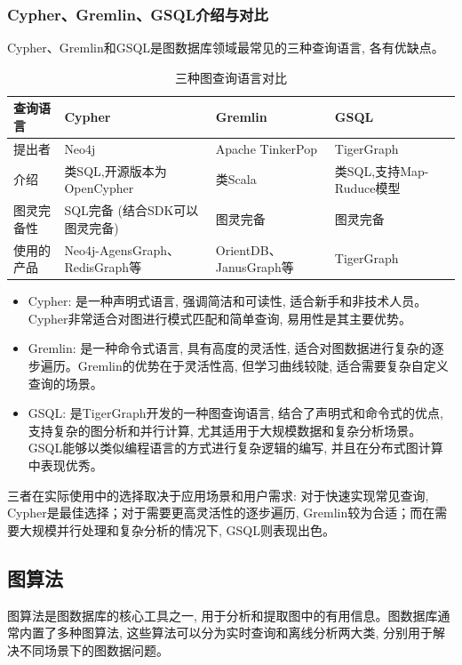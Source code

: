 \subsubsection*{Cypher、Gremlin、GSQL介绍与对比}
Cypher、Gremlin和GSQL是图数据库领域最常见的三种查询语言, 各有优缺点。
\begin{table}[htbp]
	\centering
	\caption{三种图查询语言对比}
	\begin{tabularx}{\textwidth}{|X|X|X|X|}
		\hline
		查询语言  & Cypher                       & Gremlin              & GSQL                \\
		\hline
		提出者   & Neo4j                        & Apache TinkerPop     & TigerGraph          \\
		\hline
		介绍    & 类SQL,开源版本为OpenCypher         & 类Scala               & 类SQL,支持Map-Ruduce模型 \\
		\hline
		图灵完备性 & SQL完备 (结合SDK可以图灵完备)          & 图灵完备                 & 图灵完备                \\
		\hline
		使用的产品 & Neo4j-AgensGraph、RedisGraph等 & OrientDB、JanusGraph等 & TigerGraph          \\
		\hline
	\end{tabularx}%
	\label{tab:addlabel}%
\end{table}%
\begin{itemize}
	\item Cypher: 是一种声明式语言, 强调简洁和可读性, 适合新手和非技术人员。Cypher非常适合对图进行模式匹配和简单查询, 易用性是其主要优势。
 	\item Gremlin: 是一种命令式语言, 具有高度的灵活性, 适合对图数据进行复杂的逐步遍历。Gremlin的优势在于灵活性高, 但学习曲线较陡, 适合需要复杂自定义查询的场景。
 	\item GSQL: 是TigerGraph开发的一种图查询语言, 结合了声明式和命令式的优点, 支持复杂的图分析和并行计算, 尤其适用于大规模数据和复杂分析场景。GSQL能够以类似编程语言的方式进行复杂逻辑的编写, 并且在分布式图计算中表现优秀。
\end{itemize}
三者在实际使用中的选择取决于应用场景和用户需求: 对于快速实现常见查询, Cypher是最佳选择；对于需要更高灵活性的逐步遍历, Gremlin较为合适；而在需要大规模并行处理和复杂分析的情况下, GSQL则表现出色。


\subsection{图算法}

图算法是图数据库的核心工具之一, 用于分析和提取图中的有用信息。图数据库通常内置了多种图算法, 这些算法可以分为实时查询和离线分析两大类, 分别用于解决不同场景下的图数据问题。

